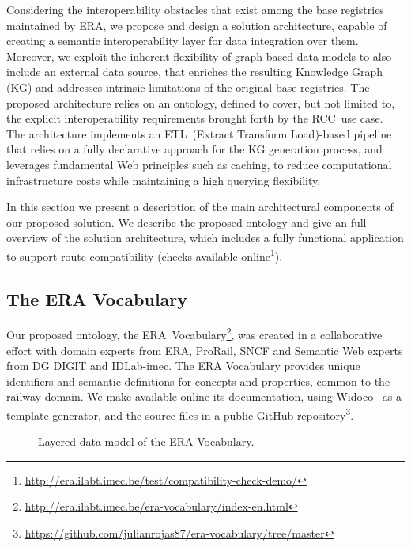 Considering the interoperability obstacles that exist among
the base registries maintained by ERA,
we propose and design a solution architecture,
capable of creating a semantic interoperability layer
for data integration over them.
Moreover, we exploit the inherent flexibility
of graph-based data models to also include an external data source,
that enriches the resulting Knowledge Graph (KG)
and addresses intrinsic limitations of the original base registries.
The proposed architecture relies on an ontology,
defined to cover, but not limited to,
the explicit interoperability requirements brought forth by the RCC~use case.
The architecture implements an ETL~(Extract Transform Load)-based pipeline
that relies on a fully declarative approach
for the KG generation process,
and leverages fundamental Web principles such as caching,
to reduce computational infrastructure costs
while maintaining a high querying flexibility.

In this section we present a description
of the main architectural components of our proposed solution.
We describe the proposed ontology and
give an full overview of the solution architecture,
which includes a fully functional application to support
route compatibility 
(checks available online\footnote{\url{http://era.ilabt.imec.be/test/compatibility-check-demo/}}).

\subsection{The ERA Vocabulary}
Our proposed ontology, %
the 
ERA~Vocabulary\footnote{\url{http://era.ilabt.imec.be/era-vocabulary/index-en.html}},
was created in a collaborative effort %
with domain experts from ERA, ProRail, SNCF
and Semantic Web experts from DG DIGIT and IDLab-imec.
The ERA Vocabulary provides unique identifiers
and semantic definitions for concepts and properties, common to the railway domain.
We make available online
its documentation,
using Widoco~\cite{garijo2020} as a template generator, %
and the source files %
in a public GitHub 
repository\footnote{\url{https://github.com/julianrojas87/era-vocabulary/tree/master}}.

\begin{figure}[t]
	
	\caption{Layered data model of the ERA Vocabulary.} 
	\label{fig:2}
\end{figure} 

